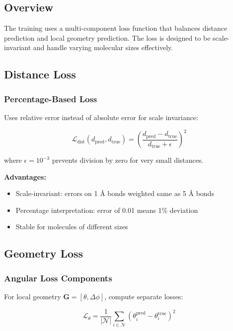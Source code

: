 \documentclass[11pt,a4paper]{article}
\begin{document}
\subsection{Overview}

The training uses a multi-component loss function that balances distance prediction and local geometry prediction. The loss is designed to be scale-invariant and handle varying molecular sizes effectively.

\subsection{Distance Loss}

\subsubsection{Percentage-Based Loss}

Uses relative error instead of absolute error for scale invariance:

\begin{equation}
\mathcal{L}_{\text{dist}}(d_{\text{pred}}, d_{\text{true}}) = \left(\frac{d_{\text{pred}} - d_{\text{true}}}{d_{\text{true}} + \epsilon}\right)^2
\end{equation}

where $\epsilon = 10^{-3}$ prevents division by zero for very small distances.

\textbf{Advantages:}
\begin{itemize}
    \item Scale-invariant: errors on 1 Å bonds weighted same as 5 Å bonds
    \item Percentage interpretation: error of 0.01 means 1\% deviation
    \item Stable for molecules of different sizes
\end{itemize}

\subsection{Geometry Loss}

\subsubsection{Angular Loss Components}

For local geometry $\mathbf{G} = [\theta, \Delta\phi]$, compute separate losses:

\begin{equation}
\mathcal{L}_{\theta} = \frac{1}{|\mathcal{N}|} \sum_{i \in \mathcal{N}} (\theta_i^{\text{pred}} - \theta_i^{\text{true}})^2
\end{equation}
\end{document}
